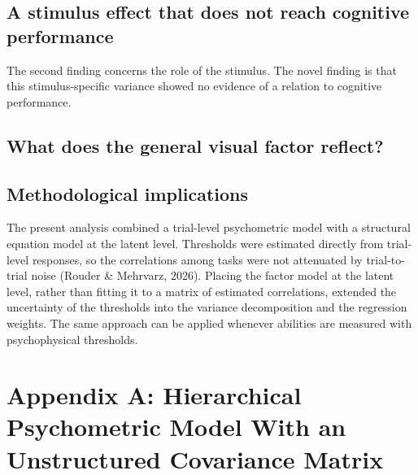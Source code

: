 \documentclass[
  ,man]{apa6}
\begin{document}
\subsection{A stimulus effect that does not reach cognitive performance}\label{a-stimulus-effect-that-does-not-reach-cognitive-performance}

The second finding concerns the role of the stimulus. The novel finding is that this stimulus-specific variance showed no evidence of a relation to cognitive performance.

\subsection{What does the general visual factor reflect?}\label{what-does-the-general-visual-factor-reflect}

\subsection{Methodological implications}\label{methodological-implications}

The present analysis combined a trial-level psychometric model with a structural equation model at the latent level. Thresholds were estimated directly from trial-level responses, so the correlations among tasks were not attenuated by trial-to-trial noise (Rouder \& Mehrvarz, 2026). Placing the factor model at the latent level, rather than fitting it to a matrix of estimated correlations, extended the uncertainty of the thresholds into the variance decomposition and the regression weights. The same approach can be applied whenever abilities are measured with psychophysical thresholds.

\newpage

\section{Appendix A: Hierarchical Psychometric Model With an Unstructured Covariance Matrix}\label{appendix-a-hierarchical-psychometric-model-with-an-unstructured-covariance-matrix}
\end{document}
